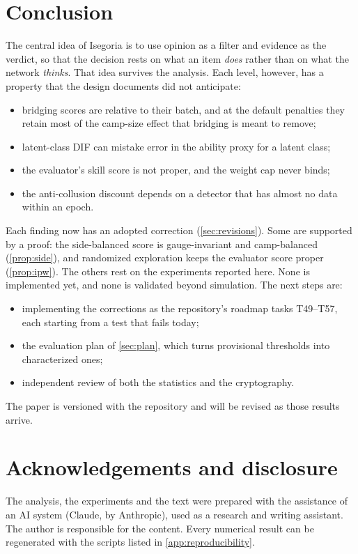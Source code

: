 \section{Conclusion}\label{sec:conclusion}

The central idea of Isegoria is to use opinion as a filter and evidence as the verdict, so that
the decision rests on what an item \emph{does} rather than on what the network \emph{thinks}. That
idea survives the analysis. Each level, however, has a property that the design documents did not
anticipate:
\begin{itemize}
  \item bridging scores are relative to their batch, and at the default penalties they retain most
    of the camp-size effect that bridging is meant to remove;
  \item latent-class DIF can mistake error in the ability proxy for a latent class;
  \item the evaluator's skill score is not proper, and the weight cap never binds;
  \item the anti-collusion discount depends on a detector that has almost no data within an epoch.
\end{itemize}
Each finding now has an adopted correction (\cref{sec:revisions}). Some are supported by a
proof: the side-balanced score is gauge-invariant and camp-balanced (\cref{prop:side}), and
randomized exploration keeps the evaluator score proper (\cref{prop:ipw}). The others rest on the
experiments reported here. None is implemented yet, and none is validated beyond simulation.
The next steps are:
\begin{itemize}
  \item implementing the corrections as the repository's roadmap tasks T49--T57, each starting
    from a test that fails today;
  \item the evaluation plan of \cref{sec:plan}, which turns provisional thresholds into
    characterized ones;
  \item independent review of both the statistics and the cryptography.
\end{itemize}
The paper is versioned with the repository and will be revised as those results arrive.

\section*{Acknowledgements and disclosure}
The analysis, the experiments and the text were prepared with the assistance of an AI system
(Claude, by Anthropic), used as a research and writing assistant. The author is responsible for
the content. Every numerical result can be regenerated with the scripts listed in
\cref{app:reproducibility}.
